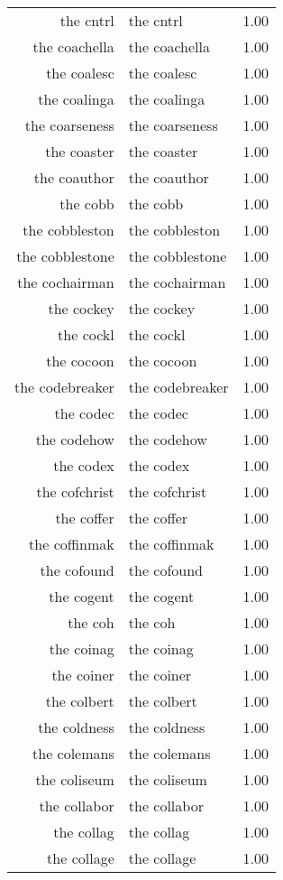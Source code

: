 \begin{table}[ht]
\begin{tabular}{rlr}
  the cntrl & the cntrl & 1.00 \\ 
  the coachella & the coachella & 1.00 \\ 
  the coalesc & the coalesc & 1.00 \\ 
  the coalinga & the coalinga & 1.00 \\ 
  the coarseness & the coarseness & 1.00 \\ 
  the coaster & the coaster & 1.00 \\ 
  the coauthor & the coauthor & 1.00 \\ 
  the cobb & the cobb & 1.00 \\ 
  the cobbleston & the cobbleston & 1.00 \\ 
  the cobblestone & the cobblestone & 1.00 \\ 
  the cochairman & the cochairman & 1.00 \\ 
  the cockey & the cockey & 1.00 \\ 
  the cockl & the cockl & 1.00 \\ 
  the cocoon & the cocoon & 1.00 \\ 
  the codebreaker & the codebreaker & 1.00 \\ 
  the codec & the codec & 1.00 \\ 
  the codehow & the codehow & 1.00 \\ 
  the codex & the codex & 1.00 \\ 
  the cofchrist & the cofchrist & 1.00 \\ 
  the coffer & the coffer & 1.00 \\ 
  the coffinmak & the coffinmak & 1.00 \\ 
  the cofound & the cofound & 1.00 \\ 
  the cogent & the cogent & 1.00 \\ 
  the coh & the coh & 1.00 \\ 
  the coinag & the coinag & 1.00 \\ 
  the coiner & the coiner & 1.00 \\ 
  the colbert & the colbert & 1.00 \\ 
  the coldness & the coldness & 1.00 \\ 
  the colemans & the colemans & 1.00 \\ 
  the coliseum & the coliseum & 1.00 \\ 
  the collabor & the collabor & 1.00 \\ 
  the collag & the collag & 1.00 \\ 
  the collage & the collage & 1.00 \\ 

\end{tabular}
\end{table}
